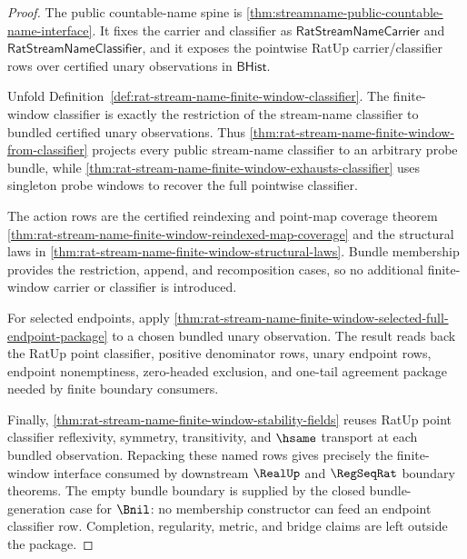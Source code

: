 \begin{proof}
The public countable-name spine is
\autoref{thm:streamname-public-countable-name-interface}.  It fixes the carrier
and classifier as $\mathsf{RatStreamNameCarrier}$ and
$\mathsf{RatStreamNameClassifier}$, and it exposes the pointwise RatUp
carrier/classifier rows over certified unary observations in $\mathsf{BHist}$.

Unfold Definition~\ref{def:rat-stream-name-finite-window-classifier}.  The
finite-window classifier is exactly the restriction of the stream-name
classifier to bundled certified unary observations.  Thus
\autoref{thm:rat-stream-name-finite-window-from-classifier} projects every
public stream-name classifier to an arbitrary probe bundle, while
\autoref{thm:rat-stream-name-finite-window-exhausts-classifier} uses singleton
probe windows to recover the full pointwise classifier.

The action rows are the certified reindexing and point-map coverage theorem
\autoref{thm:rat-stream-name-finite-window-reindexed-map-coverage} and the
structural laws in
\autoref{thm:rat-stream-name-finite-window-structural-laws}.  Bundle membership
provides the restriction, append, and recomposition cases, so no additional
finite-window carrier or classifier is introduced.

For selected endpoints, apply
\autoref{thm:rat-stream-name-finite-window-selected-full-endpoint-package} to a
chosen bundled unary observation.  The result reads back the RatUp point
classifier, positive denominator rows, unary endpoint rows, endpoint
nonemptiness, zero-headed exclusion, and one-tail agreement package needed by
finite boundary consumers.

Finally,
\autoref{thm:rat-stream-name-finite-window-stability-fields} reuses RatUp
point classifier reflexivity, symmetry, transitivity, and $\hsame$ transport at
each bundled observation.  Repacking these named rows gives precisely the
finite-window interface consumed by downstream $\RealUp$ and $\RegSeqRat$
boundary theorems.  The empty bundle boundary is supplied by
the closed bundle-generation case for $\Bnil$: no membership constructor can
feed an endpoint classifier row.  Completion, regularity, metric, and bridge
claims are left outside the package.
\end{proof}

